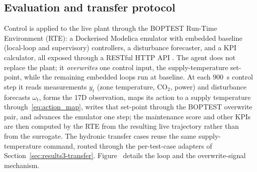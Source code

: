\subsection{Evaluation and transfer protocol}\label{ssec:m-eval}
Control is applied to the live plant through the BOPTEST Run-Time Environment (RTE): a Dockerised Modelica emulator with embedded baseline (local-loop and supervisory) controllers, a disturbance forecaster, and a KPI calculator, all exposed through a RESTful HTTP API \citep{Blum2021BOPTEST}. The agent does not replace the plant; it \emph{overwrites} one control input, the supply-temperature set-point, while the remaining embedded loops run at baseline. At each \SI{900}{\second} control step it reads measurements $y_t$ (zone temperature, CO$_2$, power) and disturbance forecasts $\omega_t$, forms the 17D observation, maps its action to a supply temperature through~\eqref{eq:action_map}, writes that set-point through the BOPTEST overwrite pair, and advances the emulator one step; the maintenance score and other KPIs are then computed by the RTE from the resulting live trajectory rather than from the surrogate. The hydronic transfer cases reuse the same supply-temperature command, routed through the per-test-case adapters of Section~\ref{sec:results3-transfer}. Figure~ details the loop and the overwrite-signal mechanism.

